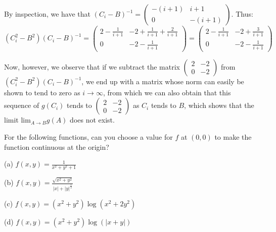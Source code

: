 \begin{solution}
    By inspection, we have that $(C_i - B)^{-1} = \begin{pmatrix}
        -(i + 1) & i + 1 \\ 0 & -(i+1)
    \end{pmatrix}$. Thus:
    $$(C_i^2 - B^2)(C_i - B)^{-1} = \left(\begin{array}{ll}
        2 - \frac{1}{i+1} & -2 + \frac{1}{i+1} + \frac{2}{i+1} \\ 0 & -2 -\frac{1}{i+1}
    \end{array}\right) = \begin{pmatrix}
        2 - \frac{1}{i+1} & -2 + \frac{3}{i+1} \\ 0 & -2 - \frac{1}{i+1}
    \end{pmatrix}$$

    Now, however, we observe that if we subtract the matrix $\begin{pmatrix}
        2 & -2 \\ 0 & -2
    \end{pmatrix}$ from $(C_i^2-B^2)(C_i-B)^{-1}$, we end up with a matrix whose norm can easily be shown to tend to zero as $i \rightarrow \infty$, from which we can also obtain that this sequence of $g(C_i)$ tends to $\begin{pmatrix}
        2 & -2 \\ 0 & -2
    \end{pmatrix}$ as $C_i$ tends to $B$, which shows that the limit $\text{lim}_{A \rightarrow B}g(A)$ does not exist.
\end{solution}

\newpage

\begin{exercise}{21}
    For the following functions, can you choose a value for $f$ at $(0, 0)$ to make the function continuous at the origin?
    
    (a) $f(x, y) = \frac{1}{x^2+y^2+1}$

    (b) $f(x, y) = \frac{\sqrt{x^2+y^2}}{\lvert x \rvert + \lvert y \rvert^{\frac{1}{3}}}$

    (c) $f(x, y) = (x^2+y^2)\log(x^2+2y^2)$

    (d) $f(x, y) = (x^2+y^2)\log(\lvert x + y \rvert)$
\end{exercise}

